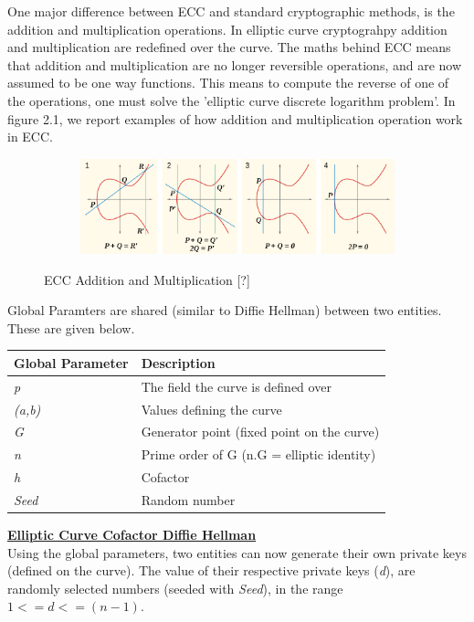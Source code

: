 \documentclass[bsc,frontabs,twoside,singlespacing,parskip,deptreport]{infthesis}     %
\begin{document}
One major difference between ECC and standard cryptographic methods, is the addition and multiplication operations. In elliptic curve cryptograhpy addition and multiplication are redefined over the curve. The maths behind ECC means that addition and multiplication are no longer reversible operations, and are now assumed to be one way functions. This means to compute the reverse of one of the operations, one must solve the 'elliptic curve discrete logarithm problem'. In figure 2.1, we report examples of how addition and multiplication operation work in ECC.
\begin{figure}[H]
\centering
\begin{subfigure}{1.2\textwidth}
  \includegraphics[width=1\linewidth]
  {images/crypto/ecc.png}
\end{subfigure}
\caption{ECC Addition and Multiplication [?]}
\end{figure}

Global Paramters are shared (similar to Diffie Hellman) between two entities. These are given below.
\begin{table}[H]
\begin{tabular}{|l|l|}
\hline
Global Parameter & Description\\
\hline
\textit{p} & The field the curve is defined over\\
\hline
\textit{(a,b)} & Values defining the curve\\
\hline
\textit{G} & Generator point (fixed point on the curve)\\
\hline
\textit{n} & Prime order of G (n.G = elliptic identity)\\
\hline
\textit{h} & Cofactor\\
\hline
\textit{Seed} & Random number\\
\hline
\end{tabular}
\end{table}

\underline{\textbf{Elliptic Curve Cofactor Diffie Hellman}}\\

Using the global parameters, two entities can now generate their own private keys (defined on the curve). The value of their respective private keys (\textit{d}), are randomly selected numbers (seeded with \textit{Seed}), in the range $ 1 <= d <= (n-1)$.
\end{document}
